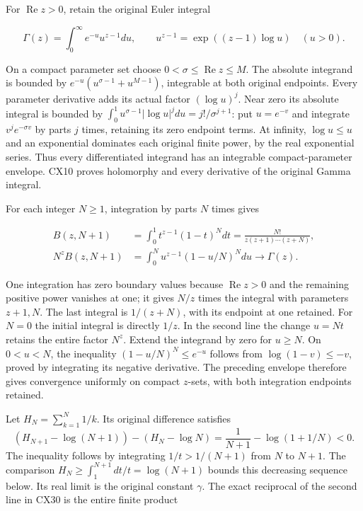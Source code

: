 \documentclass[
  11pt,
]{article}
\begin{document}
For \(\operatorname{Re}z>0\), retain the original Euler integral

\[
\Gamma(z)=\int_0^\infty e^{-u}u^{z-1}du,
\qquad u^{z-1}=\exp((z-1)\log u)\quad(u>0).
\tag{CX29}
\]

On a compact parameter set choose
\(0<\sigma\leq\operatorname{Re}z\leq M\). The absolute integrand is
bounded by \(e^{-u}(u^{\sigma-1}+u^{M-1})\), integrable at both original
endpoints. Every parameter derivative adds its actual factor
\((\log u)^j\). Near zero its absolute integral is bounded by
\(\int_0^1u^{\sigma-1}|\log u|^jdu=j!/\sigma^{j+1}\): put \(u=e^{-v}\)
and integrate \(v^je^{-\sigma v}\) by parts \(j\) times, retaining its
zero endpoint terms. At infinity, \(\log u\leq u\) and an exponential
dominates each original finite power, by the real exponential series.
Thus every differentiated integrand has an integrable compact-parameter
envelope. CX10 proves holomorphy and every derivative of the original
Gamma integral.

For each integer \(N\geq1\), integration by parts \(N\) times gives

\[
\begin{aligned}
B(z,N+1)&=\int_0^1t^{z-1}(1-t)^Ndt
              =\frac{N!}{z(z+1)\cdots(z+N)},\\
N^zB(z,N+1)&=\int_0^N u^{z-1}(1-u/N)^Ndu
                 \longrightarrow\Gamma(z).
\end{aligned}
\tag{CX30}
\]

One integration has zero boundary values because
\(\operatorname{Re}z>0\) and the remaining positive power vanishes at
one; it gives \(N/z\) times the integral with parameters \(z+1,N\). The
last integral is \(1/(z+N)\), with its endpoint at one retained. For
\(N=0\) the initial integral is directly \(1/z\). In the second line the
change \(u=Nt\) retains the entire factor \(N^z\). Extend the integrand
by zero for \(u\geq N\). On \(0<u<N\), the inequality
\((1-u/N)^N\leq e^{-u}\) follows from \(\log(1-v)\leq-v\), proved by
integrating its negative derivative. The preceding envelope therefore
gives convergence uniformly on compact \(z\)-sets, with both integration
endpoints retained.

Let \(H_N=\sum_{k=1}^N1/k\). Its original difference satisfies \[
(H_{N+1}-\log(N+1))-(H_N-\log N)
 =\frac1{N+1}-\log(1+1/N)<0 .
\tag{CX31}
\] The inequality follows by integrating \(1/t>1/(N+1)\) from \(N\) to
\(N+1\). The comparison \(H_N\geq\int_1^{N+1}dt/t=\log(N+1)\) bounds
this decreasing sequence below. Its real limit is the original constant
\(\gamma\). The exact reciprocal of the second line in CX30 is the
entire finite product
\end{document}
